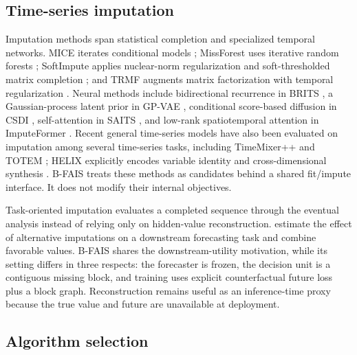 \documentclass{article}
\newcommand{\bfais}{\textsc{B-FAIS}\xspace}
\begin{document}
\subsection{Time-series imputation}

Imputation methods span statistical completion and specialized temporal networks. MICE iterates conditional models \citep{vanbuuren2011mice}; MissForest uses iterative random forests \citep{stekhoven2012missforest}; SoftImpute applies nuclear-norm regularization and soft-thresholded matrix completion \citep{mazumder2010softimpute}; and TRMF augments matrix factorization with temporal regularization \citep{yu2016trmf}. Neural methods include bidirectional recurrence in BRITS \citep{cao2018brits}, a Gaussian-process latent prior in GP-VAE \citep{fortuin2020gpvae}, conditional score-based diffusion in CSDI \citep{tashiro2021csdi}, self-attention in SAITS \citep{du2023saits}, and low-rank spatiotemporal attention in ImputeFormer \citep{nie2024imputeformer}. Recent general time-series models have also been evaluated on imputation among several time-series tasks, including TimeMixer++ and TOTEM \citep{wang2025timemixerpp,talukder2024totem}; HELIX explicitly encodes variable identity and cross-dimensional synthesis \citep{zhang2026helix}. \bfais treats these methods as candidates behind a shared fit/impute interface. It does not modify their internal objectives.

Task-oriented imputation evaluates a completed sequence through the eventual analysis instead of relying only on hidden-value reconstruction. \citet{wang2024taskoriented} estimate the effect of alternative imputations on a downstream forecasting task and combine favorable values. \bfais shares the downstream-utility motivation, while its setting differs in three respects: the forecaster is frozen, the decision unit is a contiguous missing block, and training uses explicit counterfactual future loss plus a block graph. Reconstruction remains useful as an inference-time proxy because the true value and future are unavailable at deployment.

\subsection{Algorithm selection}
\end{document}
